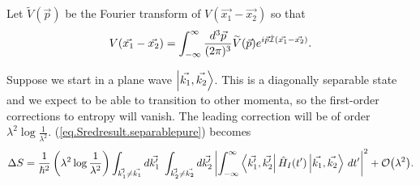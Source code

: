 Let \(\widetilde{V}(\vec{p})\) be the Fourier transform of \(V(\vec{x_1} - \vec{x_2})\) so that
\begin{equation}
\label{eq.ftV}
V(\vec{x_1} - \vec{x_2}) = \int_{-\infty}^{\infty} \frac{d^3 \vec{p}}{(2 \pi)^3} \widetilde{V}(\vec{p}) e^{i\vec{p}\hat{\mathcal{I}}(\vec{x_1} - \vec{x_2})}.
\end{equation}

Suppose we start in a plane wave \(\left|\vec{k_1}, \vec{k_2}\right\rangle\). This is a diagonally separable state and we expect to be able to transition to other momenta, so the first-order corrections to entropy will vanish. The leading correction will be of order \(\lambda^2 \log \frac{1}{\lambda^2}
\). (\ref{eq.Sredresult.separablepure}) becomes
\begin{equation}\label{eq.ex-scattering.corstart}
\Delta S =\frac{1}{\hbar^2}\left(\lambda^2 \log\frac{1}{\lambda^2}\right) \int_{\vec{k_1^\prime}\neq \vec{k_1}} d\vec{k_1^\prime} \;\int_{\vec{k_2^\prime}\neq \vec{k_2}} d\vec{k_2^\prime} \left|\int_{-\infty}^\infty \left\langle\vec{k_1^\prime}, \vec{k_2^\prime}\right| \hat{H}_I (t^{\prime})\left|\vec{k_1}, \vec{k_2}\right\rangle \,dt^{\prime}\right|^2 + \mathcal{O}{\left(\lambda^2\right)}.
\end{equation}

